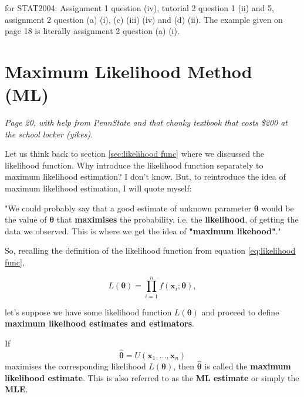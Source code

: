\begin{exercise}
    for STAT2004: Assignment 1 question (iv), tutorial 2 question 1 (ii) and 5, assignment 2 question (a) (i), (c) (iii) (iv) and (d) (ii). 
    The example given on page 18 is literally assignment 2 question (a) (i). 
\end{exercise}

\section{Maximum Likelihood Method (ML)}\label{sec:ML method}

\textit{Page 20, with help from PennState and that chonky textbook that costs \$200 at the school locker (yikes). \autocite{penn415} \autocite{rice}}

Let us think back to section \ref{sec:likelihood func} where we discussed the likelihood function. 
Why introduce the likelihood function separately to maximum likelihood estimation? 
I don't know. But, to reintroduce the idea of maximum likelihood estimation, I will quote myself:

\bigskip

"We could probably say that a good estimate of unknown parameter \(\bm{\theta}\) would be the value of \(\bm{\theta}\) that \textbf{maximises} the probability, i.e. the \textbf{likelihood}, of getting the data we observed. 
This is where we get the idea of \textbf{"maximum likehood"}." 

\bigskip

So, recalling the definition of the likelihood function from equation \ref{eq:likelihood func}, 

\begin{equation*}
    L(\bm{\theta}) = \prod_{i=1}^n f(\bm{x}_i;\bm{\theta}),
\end{equation*}

let's suppose we have some likelihood function \(L(\bm{\theta})\) and proceed to define \textbf{maximum likelhood estimates and estimators}. 

\begin{definition}\label{defn:ml estimate}
    If 
    \begin{equation}\label{eq:ml estimate}
        \hat{\bm{\theta}} = U(\bm{x}_1,...,\bm{x}_n)
    \end{equation}
    maximises the corresponding likelihood \(L(\bm{\theta})\), then \(\hat{\bm{\theta}}\) is called the \textbf{maximum likelihood estimate}.
    This is also referred to as the \textbf{ML estimate} or simply the \textbf{MLE}.
\end{definition}

